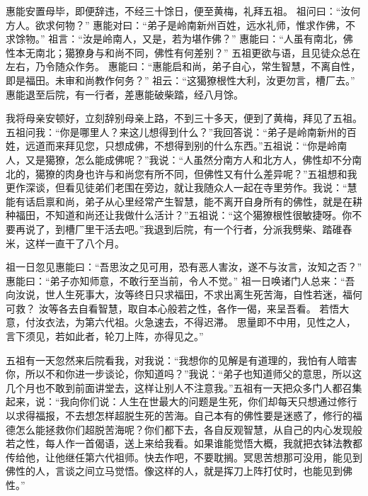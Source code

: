 \documentclass[12pt,twoside,openany]{book}
\newcommand{\kai}[1]{{\CJKfamily{kai}#1}}
\begin{document}
惠能安置母毕，即便辞违，不经三十馀日，便至黄梅，礼拜五祖。
祖问曰：“汝何方人。欲求何物？”
惠能对曰：“弟子是岭南新州百姓，远水礼师，惟求作佛，不求馀物。”
祖言：“汝是岭南人，又是，若为堪作佛？”
惠能曰：“人虽有南北，佛性本无南北；獦獠身与和尚不同，佛性有何差别？”
五祖更欲与语，且见徒众总在左右，乃令随众作务。
惠能曰：“惠能启和尚，弟子自心，常生智慧，不离自性，即是福田。未审和尚教作何务？”
祖云：“这獦獠根性大利，汝更勿言，槽厂去。”
惠能退至后院，有一行者，差惠能破柴踏，经八月馀。

\kai{我将母亲安顿好，立刻辞别母亲上路，不到三十多天，便到了黄梅，拜见了五祖。五祖问我：“你是哪里人？来这儿想得到什么？”我回答说：“弟子是岭南新州的百姓，远道而来拜见您，只想成佛，不想得到别的什么东西。”五祖说：“你是岭南人，又是獦獠，怎么能成佛呢？”我说：“人虽然分南方人和北方人，佛性却不分南北的，獦獠的肉身也许与和尚您有所不同，但佛性又有什么差异呢？”五祖想和我更作深谈，但看见徒弟们老围在旁边，就让我随众人一起在寺里劳作。我说：“慧能有话启禀和尚，弟子从心里经常产生智慧，能不离开自身所有的佛性，就是在耕种福田，不知道和尚还让我做什么活计？”五祖说：“这个獦獠根性很敏捷呀。你不要再说了，到槽厂里干活去吧。”我退到后院，有一个行者，分派我劈柴、踏碓舂米，这样一直干了八个月。}

祖一日忽见惠能曰：“吾思汝之见可用，恐有恶人害汝，遂不与汝言，汝知之否？”
惠能曰：“弟子亦知师意，不敢行至当前，令人不觉。”
祖一日唤诸门人总来：“吾向汝说，世人生死事大，汝等终日只求福田，不求出离生死苦海，自性若迷，福何可救？
汝等各去自看智慧，取自本心般若之性，各作一偈，来呈吾看。
若悟大意，付汝衣法，为第六代祖。火急速去，不得迟滞。
思量即不中用，见性之人，言下须见，若如此者，轮刀上阵，亦得见之。”

\kai{五祖有一天忽然来后院看我，对我说：“我想你的见解是有道理的，我怕有人暗害你，所以不和你进一步谈论，你知道吗？”我说：“弟子也知道师父的意思，所以这几个月也不敢到前面讲堂去，这样让别人不注意我。”五祖有一天把众多门人都召集起来，说：“我向你们说：人生在世最大的问题是生死，你们却每天只想通过修行以求得福报，不去想怎样超脱生死的苦海。自己本有的佛性要是迷惑了，修行的福德怎么能拯救你们超脱苦海呢？你们都下去，各自反观智慧，从自己的内心发现般若之性，每人作一首偈语，送上来给我看。如果谁能觉悟大概，我就把衣钵法教都传给他，让他继任第六代祖师。快去作吧，不要耽搁。冥思苦想那可没用，能见到佛性的人，言谈之间立马觉悟。像这样的人，就是挥刀上阵打仗时，也能见到佛性。”}
\end{document}
